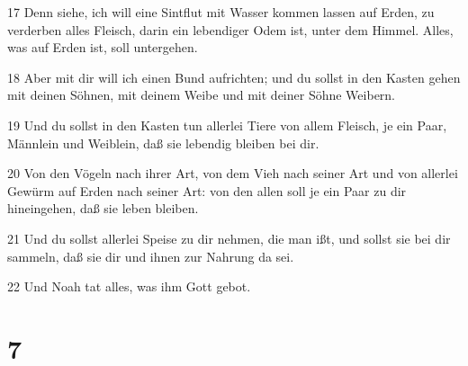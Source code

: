 \par 17 Denn siehe, ich will eine Sintflut mit Wasser kommen lassen auf Erden, zu verderben alles Fleisch, darin ein lebendiger Odem ist, unter dem Himmel. Alles, was auf Erden ist, soll untergehen.
\par 18 Aber mit dir will ich einen Bund aufrichten; und du sollst in den Kasten gehen mit deinen Söhnen, mit deinem Weibe und mit deiner Söhne Weibern.
\par 19 Und du sollst in den Kasten tun allerlei Tiere von allem Fleisch, je ein Paar, Männlein und Weiblein, daß sie lebendig bleiben bei dir.
\par 20 Von den Vögeln nach ihrer Art, von dem Vieh nach seiner Art und von allerlei Gewürm auf Erden nach seiner Art: von den allen soll je ein Paar zu dir hineingehen, daß sie leben bleiben.
\par 21 Und du sollst allerlei Speise zu dir nehmen, die man ißt, und sollst sie bei dir sammeln, daß sie dir und ihnen zur Nahrung da sei.
\par 22 Und Noah tat alles, was ihm Gott gebot.

\chapter{7}

